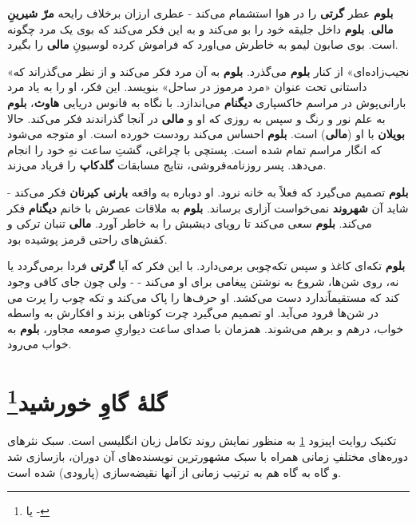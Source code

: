 \documentclass[12pt]{book}
\newcommand{\noun}[1]{{\textbf{#1}}}
\begin{document}
    \noun{بلوم} عطر \noun{گرتی} را در هوا استشمام می‌کند - عطری ارزان برخلاف رایحه \noun{مرّ شیرینِ} \noun{مالی}. \noun{بلوم} داخل جلیقه خود را بو می‌کند و به این فکر می‌کند که بوی یک مرد چگونه است. بوی صابون لیمو به خاطرش می‌اورد که فراموش کرده لوسیونِ \noun{مالی} را بگیرد.

    «نجیب‌زاده‌ای» از کنار \noun{بلوم} می‌گذرد. \noun{بلوم} به آن مرد فکر می‌کند و از نظر می‌گذراند که داستانی تحت عنوان «مرد مرموز در ساحل» بنویسد. این فکر، او را به یاد مرد بارانی‌پوش در مراسم خاکسپاری \noun{دیگنام} می‌اندازد. با نگاه به فانوس دریایی \noun{هاوث}، \noun{بلوم} به علم نور و رنگ و سپس به روزی که او و \noun{مالی} در آنجا گذراندند فکر می‌کند. حالا \noun{بویلان} با او (\noun{مالی}) است. \noun{بلوم} احساس می‌کند رودست خورده است. او متوجه می‌شود که انگار مراسم تمام شده است. پستچی با چراغی، گشتِ ساعت نهِ خود را انجام می‌دهد. پسر روزنامه‌فروشی، نتایج مسابقات \noun{گلدکاپ} را فریاد می‌زند.

    \noun{بلوم} تصمیم می‌گیرد که فعلاً به خانه نرود. او دوباره به واقعه \noun{بارنی کیرنان} فکر می‌کند - شاید آن \noun{شهروند‬} نمی‌خواست آزاری برساند. \noun{بلوم} به ملاقات عصرش با خانم \noun{دیگنام} فکر می‌کند. \noun{بلوم} سعی می‌کند تا رویای دیشبش را به خاطر آورد. \noun{مالی} تنبان ترکی و کفش‌های راحتی قرمز پوشیده بود.

    \noun{بلوم} تکه‌ای کاغذ و سپس تکه‌چوبی برمی‌دارد. با این فکر که آیا \noun{گرتی} فردا برمی‌گردد یا نه، روی شن‌ها، شروع به نوشتن پیغامی برای او می‌کند -  - ولی چون جای کافی وجود ندارد دست می‌کشد. او حرف‌ها را پاک می‌کند و تکه چوب را پرت می‎‌کند که مستقیماً در شن‌ها فرود می‌آید. او تصمیم می‌گیرد چرت کوتاهی بزند و افکارش به واسطه خواب، درهم و برهم می‌شوند. همزمان با صدای ساعت دیواریِ صومعه مجاور، \noun{بلوم} به خواب می‌رود.

    \chapter[گلهٔ گاوِ خورشید]{گلهٔ گاوِ خورشید\protect\footnote{ یا -}}\label{ep:14}
    تکنیک روایت اپیزود \ref{ep:14} به منظور نمایش روند تکامل زبان انگلیسی است. سبک نثر‌های دوره‌های مختلفِ زمانی همراه با سبک مشهورترین نویسنده‌های آن دوران، بازسازی شد و گاه به گاه هم به ترتیب زمانی از آنها نقیضه‌سازی (پارودی) شده است.
\end{document}
